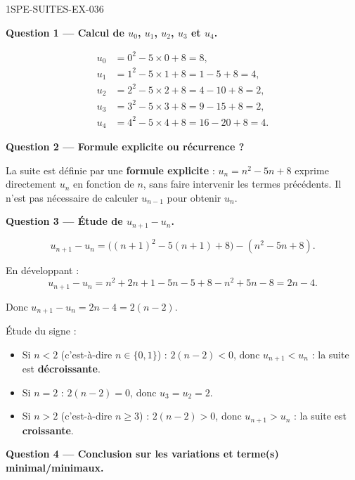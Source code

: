 \begin{corrige}{1SPE-SUITES-EX-036}

\textbf{Question 1 — Calcul de $u_0$, $u_1$, $u_2$, $u_3$ et $u_4$.}

\begin{align*}
  u_0 &= 0^2 - 5 \times 0 + 8 = 8, \\
  u_1 &= 1^2 - 5 \times 1 + 8 = 1 - 5 + 8 = 4, \\
  u_2 &= 2^2 - 5 \times 2 + 8 = 4 - 10 + 8 = 2, \\
  u_3 &= 3^2 - 5 \times 3 + 8 = 9 - 15 + 8 = 2, \\
  u_4 &= 4^2 - 5 \times 4 + 8 = 16 - 20 + 8 = 4.
\end{align*}

\medskip
\textbf{Question 2 — Formule explicite ou récurrence ?}

La suite est définie par une \textbf{formule explicite} : $u_n = n^2 - 5n + 8$ exprime directement $u_n$ en fonction de $n$, sans faire intervenir les termes précédents. Il n'est pas nécessaire de calculer $u_{n-1}$ pour obtenir $u_n$.

\medskip
\textbf{Question 3 — Étude de $u_{n+1} - u_n$.}

\[
  u_{n+1} - u_n = \bigl((n+1)^2 - 5(n+1) + 8\bigr) - (n^2 - 5n + 8).
\]

En développant :
\[
  u_{n+1} - u_n = n^2 + 2n + 1 - 5n - 5 + 8 - n^2 + 5n - 8 = 2n - 4.
\]


Donc $u_{n+1} - u_n = 2n - 4 = 2(n - 2)$.

Étude du signe :
\begin{itemize}
  \item Si $n < 2$ (c'est-à-dire $n \in \{0, 1\}$) : $2(n-2) < 0$, donc $u_{n+1} < u_n$ : la suite est \textbf{décroissante}.
  \item Si $n = 2$ : $2(n-2) = 0$, donc $u_3 = u_2 = 2$.
  \item Si $n > 2$ (c'est-à-dire $n \geq 3$) : $2(n-2) > 0$, donc $u_{n+1} > u_n$ : la suite est \textbf{croissante}.
\end{itemize}

\medskip
\textbf{Question 4 — Conclusion sur les variations et terme(s) minimal/minimaux.}



\end{corrige}
